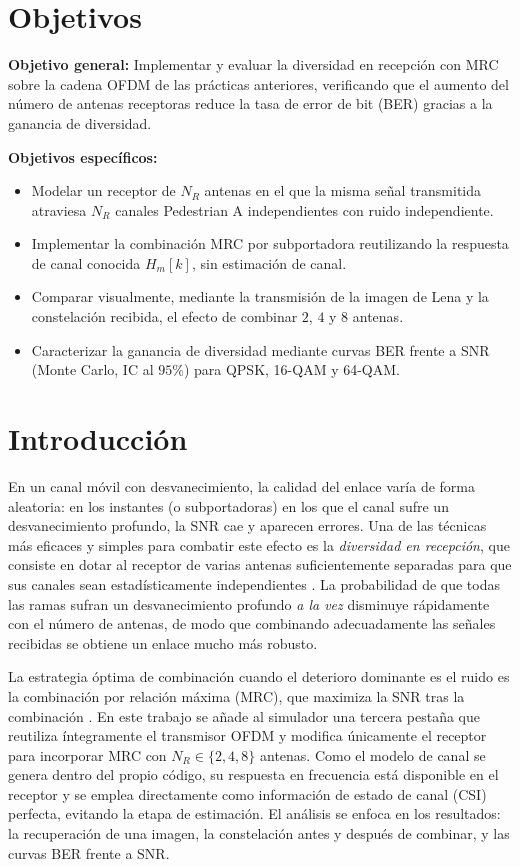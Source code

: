 \documentclass[conference,onecolumn]{IEEEtran}
\begin{document}
\section*{Objetivos}

\textbf{Objetivo general:} Implementar y evaluar la diversidad en recepci\'on con MRC sobre la cadena OFDM de las pr\'acticas anteriores, verificando que el aumento del n\'umero de antenas receptoras reduce la tasa de error de bit (BER) gracias a la ganancia de diversidad.

\textbf{Objetivos espec\'ificos:}
\begin{itemize}
    \item Modelar un receptor de $N_R$ antenas en el que la misma se\~nal transmitida atraviesa $N_R$ canales Pedestrian A independientes con ruido independiente.
    \item Implementar la combinaci\'on MRC por subportadora reutilizando la respuesta de canal conocida $H_m[k]$, sin estimaci\'on de canal.
    \item Comparar visualmente, mediante la transmisi\'on de la imagen de Lena y la constelaci\'on recibida, el efecto de combinar $2$, $4$ y $8$ antenas.
    \item Caracterizar la ganancia de diversidad mediante curvas BER frente a SNR (Monte Carlo, IC al $95\%$) para QPSK, 16-QAM y 64-QAM.
\end{itemize}

\section{Introducci\'on}

En un canal m\'ovil con desvanecimiento, la calidad del enlace var\'ia de forma aleatoria: en los instantes (o subportadoras) en los que el canal sufre un desvanecimiento profundo, la SNR cae y aparecen errores. Una de las t\'ecnicas m\'as eficaces y simples para combatir este efecto es la \emph{diversidad en recepci\'on}, que consiste en dotar al receptor de varias antenas suficientemente separadas para que sus canales sean estad\'isticamente independientes \cite{vazquezrodas_lte,dahlman2014lte}. La probabilidad de que todas las ramas sufran un desvanecimiento profundo \emph{a la vez} disminuye r\'apidamente con el n\'umero de antenas, de modo que combinando adecuadamente las se\~nales recibidas se obtiene un enlace mucho m\'as robusto.

La estrategia \'optima de combinaci\'on cuando el deterioro dominante es el ruido es la combinaci\'on por relaci\'on m\'axima (MRC), que maximiza la SNR tras la combinaci\'on \cite{brennan2003linear,goldsmith2005wireless}. En este trabajo se a\~nade al simulador una tercera pesta\~na que reutiliza \'integramente el transmisor OFDM y modifica \'unicamente el receptor para incorporar MRC con $N_R\in\{2,4,8\}$ antenas. Como el modelo de canal se genera dentro del propio c\'odigo, su respuesta en frecuencia est\'a disponible en el receptor y se emplea directamente como informaci\'on de estado de canal (CSI) perfecta, evitando la etapa de estimaci\'on. El an\'alisis se enfoca en los resultados: la recuperaci\'on de una imagen, la constelaci\'on antes y despu\'es de combinar, y las curvas BER frente a SNR.
\end{document}
